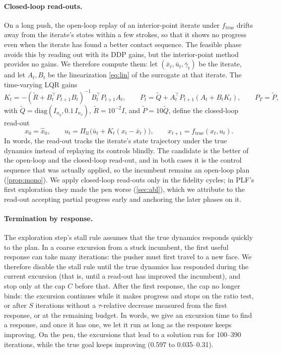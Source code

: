 \documentclass[11pt]{article}
\theoremstyle{remark}
\newcommand{\ftrue}{f_{\mathrm{true}}}
\newcommand{\U}{\mathcal{U}}
\begin{document}
\paragraph{Closed-loop read-outs.} On a long push, the open-loop replay of an interior-point iterate under $\ftrue$ drifts away from the iterate's states within a few strokes, so that it shows no progress even when the iterate has found a better contact sequence. The feasible phase avoids this by reading out with its DDP gains, but the interior-point method provides no gains. We therefore compute them: let $(\bar x_t, \bar u_t, \bar\gamma_t)$ be the iterate, and let $A_t, B_t$ be the linearization \cref{eq:lin} of the surrogate at that iterate. The time-varying LQR gains
\begin{equation}
\label{eq:tvlqr}
K_t = -(\tilde R + B_t^\top P_{t+1} B_t)^{-1} B_t^\top P_{t+1} A_t, \qquad P_t = \tilde Q + A_t^\top P_{t+1}(A_t + B_t K_t), \qquad P_T = \tilde P,
\end{equation}
with $\tilde Q = \mathrm{diag}(I_{n_q}, 0.1\, I_{n_v})$, $\tilde R = 10^{-2} I$, and $\tilde P = 10\tilde Q$, define the closed-loop read-out
\begin{equation}
\label{eq:cl}
x_0 = \hat x_0, \qquad u_t = \Pi_\U\big(\bar u_t + K_t(x_t - \bar x_t)\big), \qquad x_{t+1} = \ftrue(x_t, u_t).
\end{equation}
In words, the read-out tracks the iterate's state trajectory under the true dynamics instead of replaying its controls blindly. The candidate is the better of the open-loop and the closed-loop read-out, and in both cases it is the control sequence that was actually applied, so the incumbent remains an open-loop plan (\cref{prop:mono}). We apply closed-loop read-outs only in the fidelity cycles; in PLF's first exploration they made the pen worse (\cref{sec:abl}), which we attribute to the read-out accepting partial progress early and anchoring the later phases on it.

\paragraph{Termination by response.} The exploration step's stall rule assumes that the true dynamics responds quickly to the plan. In a coarse excursion from a stuck incumbent, the first useful response can take many iterations: the pusher must first travel to a new face. We therefore disable the stall rule until the true dynamics has responded during the current excursion (that is, until a read-out has improved the incumbent), and stop only at the cap $C$ before that. After the first response, the cap no longer binds: the excursion continues while it makes progress and stops on the ratio test, or after $S$ iterations without a $\tau$-relative decrease measured from the first response, or at the remaining budget. In words, we give an excursion time to find a response, and once it has one, we let it run as long as the response keeps improving. On the pen, the excursions that lead to a solution run for 100--390 iterations, while the true goal keeps improving (0.597 to 0.035--0.31).
\end{document}
